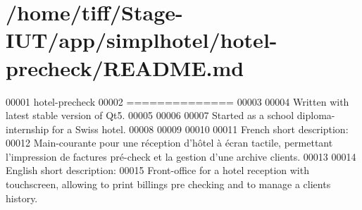 \hypertarget{README_8md_source}{\section{/home/tiff/\-Stage-\/\-I\-U\-T/app/simplhotel/hotel-\/precheck/\-R\-E\-A\-D\-M\-E.md}
}

\begin{DoxyCode}
00001 hotel-precheck
00002 ==============
00003 
00004 Written with latest stable version of Qt5.
00005 
00006 
00007 Started as a school diploma-internship \textcolor{keywordflow}{for} a Swiss hotel.
00008 
00009 
00010 
00011 French \textcolor{keywordtype}{short} description:
00012 Main-courante pour une réception d\textcolor{stringliteral}{'hôtel à écran tactile, permettant l'}impression de factures pré-check et 
      la gestion d\textcolor{stringliteral}{'une archive clients.}
00013 \textcolor{stringliteral}{}
00014 \textcolor{stringliteral}{English short description:}
00015 \textcolor{stringliteral}{Front-office for a hotel reception with touchscreen, allowing to print billings pre checking and to manage
       a clients history.}
\end{DoxyCode}
